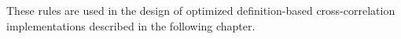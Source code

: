These rules are used in the design of optimized definition-based cross-correlation implementations described in the following chapter.







